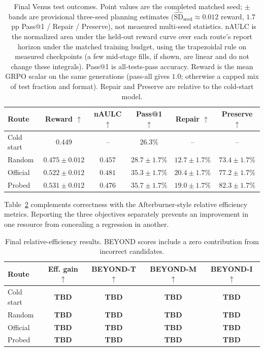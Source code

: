 \begin{table}[t]
    \centering
    \caption{Final Venus test outcomes. Point values are the completed matched
    seed; $\pm$ bands are provisional three-seed planning estimates
    ($\widehat{\mathrm{SD}}_{\mathrm{seed}}\!\approx\!0.012$ reward,
    $1.7$~pp Pass@1 / Repair / Preserve), not measured multi-seed statistics.
    nAULC is the normalized area under the held-out reward curve over each
    route's report horizon under the matched training budget, using the
    trapezoidal rule on measured checkpoints (a few mid-stage fills, if shown,
    are linear and do not change these integrals).
    Pass@1 is all-tests-pass accuracy. Reward is the mean GRPO scalar on the same
    generations (pass-all gives $1.0$; otherwise a capped mix of test fraction and
    format). Repair and Preserve are relative to the cold-start model.}
    \label{tab:main-results}
    \scriptsize
    \begin{tabular}{lccccc}
        \hline
        Route & Reward $\uparrow$ & nAULC $\uparrow$ & Pass@1 $\uparrow$ & Repair $\uparrow$ & Preserve $\uparrow$ \\
        \hline
        Cold start & $0.449$ & -- & $26.3\%$ & -- & -- \\
        Random & $0.475{\pm}0.012$ & $0.457$ & $28.7{\pm}1.7\%$ & $12.7{\pm}1.7\%$ & $73.4{\pm}1.7\%$ \\
        Official & $0.522{\pm}0.012$ & $\mathbf{0.481}$ & $35.3{\pm}1.7\%$ & $20.4{\pm}1.7\%$ & $77.2{\pm}1.7\%$ \\
        Probed & $\mathbf{0.531{\pm}0.012}$ & $0.476$ & $\mathbf{35.7{\pm}1.7\%}$ & $19.0{\pm}1.7\%$ & $\mathbf{82.3{\pm}1.7\%}$ \\
        \hline
    \end{tabular}
\end{table}

Table~\ref{tab:efficiency-results} complements correctness with the
Afterburner-style relative efficiency metrics. Reporting the three objectives
separately prevents an improvement in one resource from concealing a regression
in another.

\begin{table}[t]
    \centering
    \caption{Final relative-efficiency results. BEYOND scores include a zero
    contribution from incorrect candidates.}
    \label{tab:efficiency-results}
    \small
    \begin{tabular}{lcccc}
        \hline
        Route & Eff. gain $\uparrow$ & BEYOND-T $\uparrow$ & BEYOND-M $\uparrow$ & BEYOND-I $\uparrow$ \\
        \hline
        Cold start & \textbf{TBD} & \textbf{TBD} & \textbf{TBD} & \textbf{TBD} \\
        Random & \textbf{TBD} & \textbf{TBD} & \textbf{TBD} & \textbf{TBD} \\
        Official & \textbf{TBD} & \textbf{TBD} & \textbf{TBD} & \textbf{TBD} \\
        Probed & \textbf{TBD} & \textbf{TBD} & \textbf{TBD} & \textbf{TBD} \\
        \hline
    \end{tabular}
\end{table}

